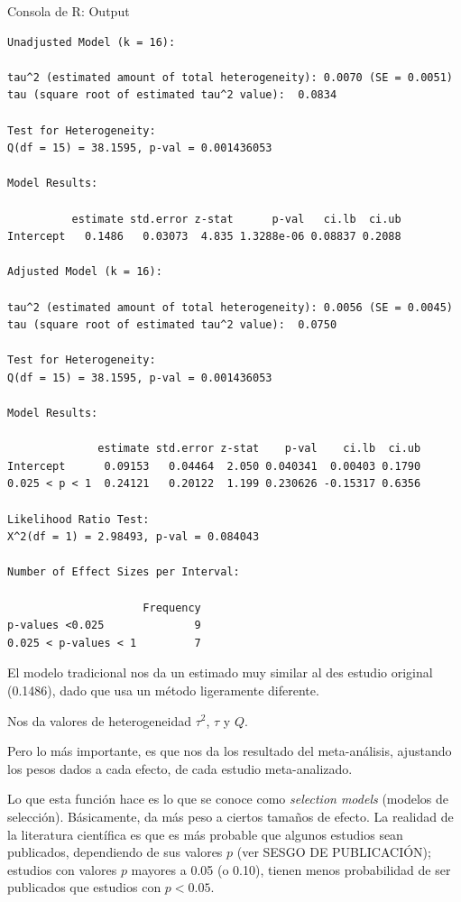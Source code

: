 \documentclass[
  bookmarksnumbered]{article}
\begin{document}
\begin{ROut}{Consola de R: Output~\thetcbcounter}
                \begin{footnotesize}
                \begin{verbatim} 
Unadjusted Model (k = 16):

tau^2 (estimated amount of total heterogeneity): 0.0070 (SE = 0.0051)
tau (square root of estimated tau^2 value):  0.0834

Test for Heterogeneity:
Q(df = 15) = 38.1595, p-val = 0.001436053

Model Results:

          estimate std.error z-stat      p-val   ci.lb  ci.ub
Intercept   0.1486   0.03073  4.835 1.3288e-06 0.08837 0.2088

Adjusted Model (k = 16):

tau^2 (estimated amount of total heterogeneity): 0.0056 (SE = 0.0045)
tau (square root of estimated tau^2 value):  0.0750

Test for Heterogeneity:
Q(df = 15) = 38.1595, p-val = 0.001436053

Model Results:

              estimate std.error z-stat    p-val    ci.lb  ci.ub
Intercept      0.09153   0.04464  2.050 0.040341  0.00403 0.1790
0.025 < p < 1  0.24121   0.20122  1.199 0.230626 -0.15317 0.6356

Likelihood Ratio Test:
X^2(df = 1) = 2.98493, p-val = 0.084043

Number of Effect Sizes per Interval:

                     Frequency
p-values <0.025              9
0.025 < p-values < 1         7
 \end{verbatim}
                \end{footnotesize}
                \end{ROut}

El modelo tradicional nos da un estimado muy similar al des estudio original (0.1486), dado que usa un método ligeramente diferente.

Nos da valores de heterogeneidad \(\tau^2\), \(\tau\) y \(Q\).

Pero lo más importante, es que nos da los resultado del meta-análisis, ajustando los pesos dados a cada efecto, de cada estudio meta-analizado.

Lo que esta función hace es lo que se conoce como \emph{selection models} (modelos de selección). Básicamente, da más peso a ciertos tamaños de efecto. La realidad de la literatura científica es que es más probable que algunos estudios sean publicados, dependiendo de sus valores \(p\) (ver SESGO DE PUBLICACIÓN); estudios con valores \(p\) mayores a 0.05 (o 0.10), tienen menos probabilidad de ser publicados que estudios con \(p < 0.05\).
\end{document}
